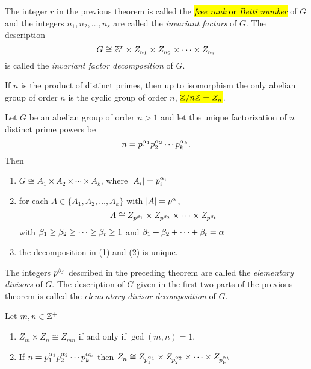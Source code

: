 \nl

\begin{defn}
The integer $r$ in the previous theorem is called the \hl{\textit{free rank} or \textit{Betti number}} of $G$ and the integers $n_1, n_2,\ldots,n_s$ are called the \textit{invariant factors} of $G$. The description 
\[G\cong \mathbb{Z}^r\times Z_{n_1}\times Z_{n_2}\times\cdots\times Z_{n_s}\]
is called the \textit{invariant factor decomposition} of $G$.
\end{defn}

\nl

\begin{cor}
If $n$ is the product of distinct primes, then up to isomorphism the only abelian group of order $n$ is the cyclic group of order $n$, \hl{$\mathbb{Z}/n\mathbb{Z} = Z_n$}.
\end{cor}

\nl

\begin{thm}
Let $G$ be an abelian group of order $n > 1$ and let the unique factorization of $n$ distinct prime powers be
\[n = p_1^{\alpha_1}p_2^{\alpha_2}\cdots p_k^{\alpha_k}.\]
Then
\begin{enumerate}
\item $G\cong A_1\times A_2\times\cdots\times A_k$, where $|A_i| = p_i^{\alpha_i}$
\item for each $A\in \{A_1,A_2,\ldots,A_k\}$ with $|A| = p^\alpha$,
\[A\cong  Z_{p^{\beta_1}}\times Z_{p^{\beta_2}}\times\cdots\times Z_{p^{\beta_t}}\]
with $\beta_1\geq\beta_2\geq\cdots\geq\beta_t\geq 1$ and $\beta_1+\beta_2+\cdots+\beta_t = \alpha$
\item the decomposition in (1) and (2) is unique.
\end{enumerate}
\end{thm}

\nl

\begin{defn}
The integers $p^{\beta_j}$ described in the preceding theorem are called the \textit{elementary divisors} of $G$. The description of $G$ given in the first two parts of the previous theorem is called the \textit{elementary divisor decomposition} of $G$.
\end{defn}

\nl

\begin{prop}
Let $m,n\in \mathbb{Z}^+$
\begin{enumerate}
\item $Z_m\times Z_n\cong Z_{mn}$ if and only if $\gcd(m,n) = 1$.
\item If $n = p_1^{\alpha_1}p_2^{\alpha_2}\cdots p_k^{\alpha_k}$ then $Z_n \cong  Z_{p_1^{\alpha_1}}\times Z_{p_2^{\alpha_2}}\times\cdots\times Z_{p_k^{\alpha_k}}$
\end{enumerate}
\end{prop}

